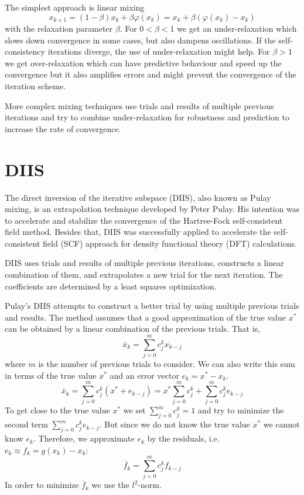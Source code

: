 The simplest approach is linear mixing
\begin{equation} \label{eq:linmix}
x_{k+1} = (1-\beta) x_k + \beta \varphi(x_k) = x_k + \beta (\varphi(x_k) - x_k)
\end{equation}
with the relaxation parameter \(\beta\).
For \(0 < \beta < 1\) we get an under-relaxation which slows down convergence in some cases, but also dampens oscillations. If the self-consistency iterations diverge, the use of under-relaxation might help.
For \(\beta > 1\) we get over-relaxation which can have predictive behaviour and speed up the convergence but it also amplifies errors and might prevent the convergence of the iteration scheme.

More complex mixing techniques use trials and results of multiple previous iterations and try to combine under-relaxation for robustness and prediction to increase the rate of convergence\cite{anderson_mixing}.

\section{DIIS}
The direct inversion of the iterative subspace (DIIS), also known as Pulay mixing, is an extrapolation technique developed by Peter Pulay\cite{diis_pulay1}\cite{diis_pulay2}. His intention was to accelerate and stabilize the convergence of the Hartree-Fock self-consistent field method. Besides that, DIIS was successfully applied to accelerate the self-consistent field (SCF) approach for density functional theory (DFT) calculations.\cite{diis_restarted}

DIIS uses trials and results of multiple previous iterations, constructs a linear combination of them, and extrapolates a new trial for the next iteration. The coefficients are determined by a least squares optimization.

Pulay's DIIS attempts to construct a better trial by using multiple previous trials and results. The method assumes that a good approximation of the true value \(x^\ast\) can be obtained by a linear combination of the previous trials. That is,
\begin{equation} \label{eq:diis_x}
\overline{x}_{k} = \sum_{j=0}^{m} c_j^k x_{k-j}
\end{equation}
where \(m\) is the number of previous trials to consider. We can also write this sum in terms of the true value \(x^\ast\) and an error vector \(e_{k} = x^\ast - x_{k}\).
\[\overline{x}_{k} = \sum_{j=0}^{m} c_j^k (x^\ast + e_{k-j}) = x^\ast \sum_{j=0}^{m} c_j^k + \sum_{j=0}^{m} c_j^k e_{k-j}\]
To get close to the true value \(x^\ast\) we set \(\sum_{j=0}^{m} c_j^k = 1\) and try to minimize the second term \(\sum_{j=0}^{m} c_j^k e_{k-j}\). But since we do not know the true value \(x^\ast\) we cannot know \(e_{k}\). Therefore, we approximate \(e_{k}\) by the residuals, i.e. \(e_{k} \approx f_{k} = g(x_k) - x_k\):
\begin{equation}
\overline{f}_{k} = \sum_{j=0}^{m} c_j^k f_{k-j}
\end{equation}
In order to minimize \(\overline{f}_{k}\) we use the \(l^2\)-norm.

